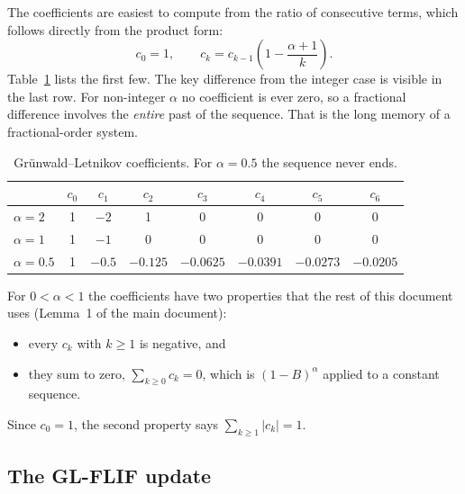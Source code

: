 \documentclass[11pt,a4paper]{article}
\begin{document}
The coefficients are easiest to compute from the ratio of consecutive terms, which follows directly from the product form:
\begin{equation}
c_0 = 1, \qquad c_k = c_{k-1}\left( 1 - \frac{\alpha + 1}{k} \right).
\label{eq:crec}
\end{equation}
Table~\ref{tab:coeffs} lists the first few. The key difference from the integer case is visible in the last row. For non-integer $\alpha$ no coefficient is ever zero, so a fractional difference involves the \emph{entire} past of the sequence. That is the long memory of a fractional-order system.

\begin{table}[h]
\centering
\small
\begin{tabular}{@{}lccccccc@{}}
\toprule
& $c_0$ & $c_1$ & $c_2$ & $c_3$ & $c_4$ & $c_5$ & $c_6$ \\
\midrule
$\alpha = 2$ & 1 & $-2$ & 1 & 0 & 0 & 0 & 0 \\
$\alpha = 1$ & 1 & $-1$ & 0 & 0 & 0 & 0 & 0 \\
$\alpha = 0.5$ & 1 & $-0.5$ & $-0.125$ & $-0.0625$ & $-0.0391$ & $-0.0273$ & $-0.0205$ \\
\bottomrule
\end{tabular}
\caption{Grünwald--Letnikov coefficients. For $\alpha = 0.5$ the sequence never ends.}
\label{tab:coeffs}
\end{table}

For $0 < \alpha < 1$ the coefficients have two properties that the rest of this document uses (Lemma~1 of the main document):
\begin{itemize}
  \item every $c_k$ with $k \ge 1$ is negative, and
  \item they sum to zero, $\sum_{k \ge 0} c_k = 0$, which is $(1 - B)^{\alpha}$ applied to a constant sequence.
\end{itemize}
Since $c_0 = 1$, the second property says $\sum_{k \ge 1} |c_k| = 1$.

\subsection{The GL-FLIF update}
\end{document}
